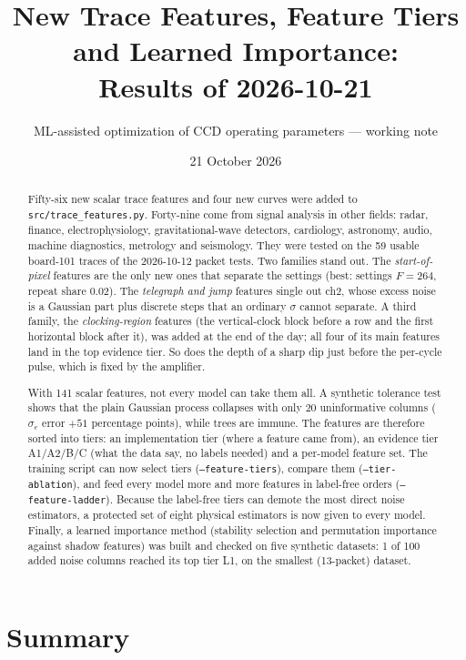 \documentclass[10pt]{article}
\title{New Trace Features, Feature Tiers and Learned Importance:\\ Results of 2026-10-21}
\author{ML-assisted optimization of CCD operating parameters --- working note}
\date{21 October 2026}
\newcommand{\code}[1]{\texttt{#1}}
\newcommand{\se}{\sigma_e}
\begin{document}
\maketitle

\begin{abstract}
Fifty-six new scalar trace features and four new curves were added to \code{src/trace\_features.py}. Forty-nine come from
signal analysis in other fields: radar, finance, electrophysiology, gravitational-wave detectors, cardiology, astronomy,
audio, machine diagnostics, metrology and seismology. They were tested on the 59 usable board-101 traces of the
2026-10-12 packet tests. Two families stand out. The \emph{start-of-pixel} features are the only new ones that separate
the settings (best: settings $F = 264$, repeat share 0.02). The \emph{telegraph and jump} features single out ch2, whose
excess noise is a Gaussian part plus discrete steps that an ordinary $\sigma$ cannot separate. A third family, the
\emph{clocking-region} features (the vertical-clock block before a row and the first horizontal block after it), was
added at the end of the day; all four of its main features land in the top evidence tier. So does the depth of a
sharp dip just before the per-cycle pulse, which is fixed by the amplifier.

With 141 scalar features, not every model can take them all. A synthetic tolerance test shows that the plain Gaussian
process collapses with only 20 uninformative columns ($\se$ error $+51$ percentage points), while trees are immune. The
features are therefore sorted into tiers: an implementation tier (where a feature came from), an evidence tier A1/A2/B/C
(what the data say, no labels needed) and a per-model feature set. The training script can now select tiers
(\code{--feature-tiers}), compare them (\code{--tier-ablation}), and feed every model more and more features in
label-free orders (\code{--feature-ladder}). Because the label-free tiers can demote the most direct noise estimators,
a protected set of eight physical estimators is now given to every model. Finally, a learned importance method
(stability selection and permutation importance against shadow features) was built and checked on five synthetic
datasets: 1 of 100 added noise columns reached its top tier L1, on the smallest (13-packet) dataset.
\end{abstract}

\tableofcontents

\section{Summary}
\end{document}
